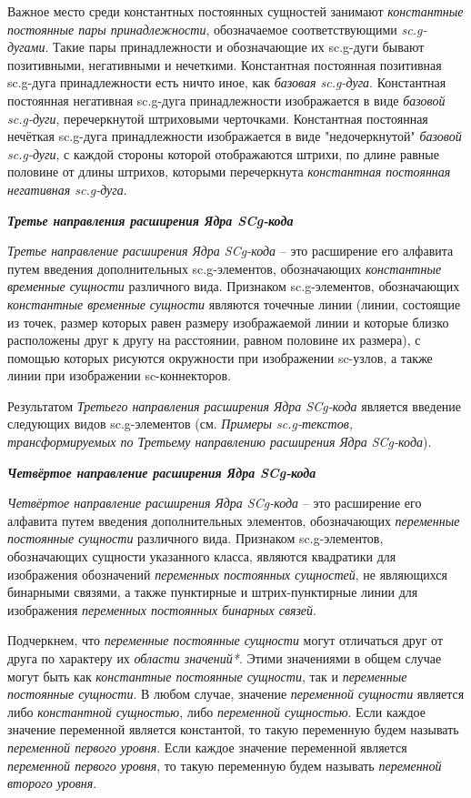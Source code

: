 Важное место среди константных постоянных сущностей занимают \textit{константные постоянные пары принадлежности}, обозначаемое соответствующими \textit{sc.g-дугами}. Такие пары принадлежности и обозначающие их sc.g-дуги бывают позитивными, негативными и нечеткими. Константная постоянная позитивная sc.g-дуга принадлежности есть ничто иное, как \textit{базовая sc.g-дуга}. Константная постоянная негативная sc.g-дуга принадлежности изображается в виде \textit{базовой sc.g-дуги}, перечеркнутой штриховыми черточками. Константная постоянная нечёткая sc.g-дуга принадлежности изображается в виде "недочеркнутой"{} \textit{базовой sc.g-дуги}, с каждой стороны которой отображаются штрихи, по длине равные половине от длины штрихов, которыми перечеркнута \textit{константная постоянная негативная sc.g-дуга}.


\textbf{\textit{Третье направления расширения Ядра SCg-кода}}

\textit{Третье направление расширения Ядра SCg-кода} -- это расширение его алфавита путем введения дополнительных sc.g-элементов, обозначающих \textit{константные временные сущности} различного вида. Признаком sc.g-элементов, обозначающих \textit{константные временные сущности} являются точечные линии (линии, состоящие из точек, размер которых равен размеру изображаемой линии и которые близко расположены друг к другу на расстоянии, равном половине их размера), с помощью которых рисуются окружности при изображении sc-узлов, а также линии при изображении sc-коннекторов.

Результатом \textit{Третьего направления расширения Ядра SCg-кода} является введение следующих видов sc.g-элементов (см. \textit{Примеры sc.g-текстов, трансформируемых по Третьему направлению расширения Ядра SCg-кода}).



\textbf{\textit{Четвёртое направление расширения Ядра SCg-кода}}

\textit{Четвёртое направление расширения Ядра SCg-кода} -- это расширение его алфавита путем введения дополнительных элементов, обозначающих \textit{переменные постоянные сущности} различного вида. Признаком sc.g-элементов, обозначающих сущности указанного класса, являются квадратики для изображения обозначений \textit{переменных постоянных сущностей}, не являющихся бинарными связями, а также пунктирные и штрих-пунктирные линии для изображения \textit{переменных постоянных бинарных связей}. 

Подчеркнем, что \textit{переменные постоянные сущности} могут отличаться друг от друга по характеру их \textit{области значений*}. Этими значениями в общем случае могут быть как \textit{константные постоянные сущности}, так и \textit{переменные постоянные сущности}. В любом случае, значение \textit{переменной сущности} является либо \textit{константной сущностью}, либо \textit{переменной сущностью}. Если каждое значение переменной является константой, то такую переменную будем называть \textit{переменной первого уровня}. Если каждое значение переменной является \textit{переменной первого уровня}, то такую переменную будем называть \textit{переменной второго уровня}. 

